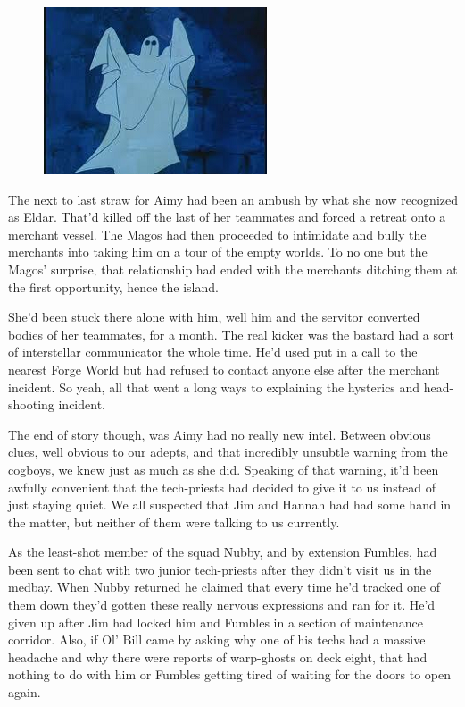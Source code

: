 \begin{figure}
	\begin{center}
		\includegraphics[width=\figwidth]{pics/11/38.png}
	\end{center}
\end{figure}
The next to last straw for Aimy had been an ambush by what she now recognized as Eldar. 
That'd killed off the last of her teammates and forced a retreat onto a merchant vessel. 
The Magos had then proceeded to intimidate and bully the merchants into taking him on a tour of the empty worlds. 
To no one but the Magos' surprise, that relationship had ended with the merchants ditching them at the first opportunity, hence the island. 


She'd been stuck there alone with him, well him and the servitor converted bodies of her teammates, for a month. 
The real kicker was the bastard had a sort of interstellar communicator the whole time. 
He'd used put in a call to the nearest Forge World but had refused to contact anyone else after the merchant incident. 
So yeah, all that went a long ways to explaining the hysterics and head-shooting incident. 


The end of story though, was Aimy had no really new intel. 
Between obvious clues, well obvious to our adepts, and that incredibly unsubtle warning from the cogboys, we knew just as much as she did. 
Speaking of that warning, it'd been awfully convenient that the tech-priests had decided to give it to us instead of just staying quiet. 
We all suspected that Jim and Hannah had had some hand in the matter, but neither of them were talking to us currently. 


As the least-shot member of the squad Nubby, and by extension Fumbles, had been sent to chat with two junior tech-priests after they didn't visit us in the medbay. 
When Nubby returned he claimed that every time he'd tracked one of them down they'd gotten these really nervous expressions and ran for it. 
He'd given up after Jim had locked him and Fumbles in a section of maintenance corridor. 
Also, if Ol' Bill came by asking why one of his techs had a massive headache and why there were reports of warp-ghosts on deck eight, that had nothing to do with him or Fumbles getting tired of waiting for the doors to open again.

